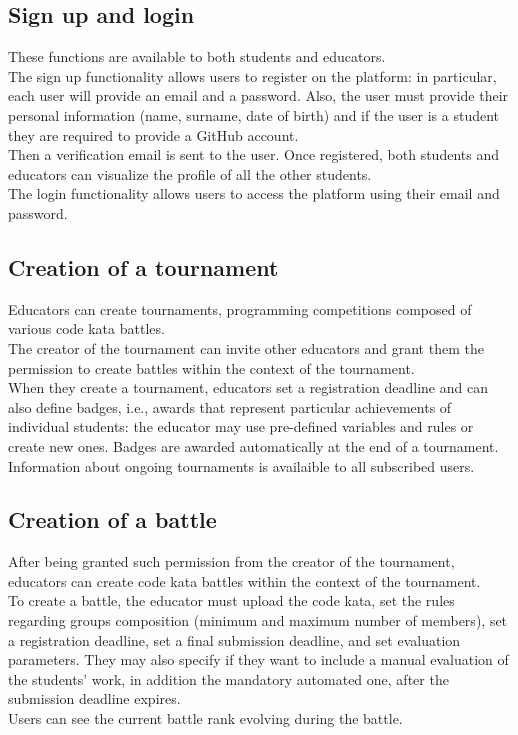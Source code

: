 \subsection{Sign up and login}
These functions are available to both students and educators.\\
The sign up functionality allows users to register on the platform: in particular, each user will provide an email 
and a password. Also, the user must provide their personal information (name, surname, date of birth) and 
if the user is a student they are required to provide a GitHub account.\\
Then a verification email is sent to the user.
Once registered, both students and educators can visualize the profile of all the other students.\\
The login functionality allows users to access the platform using their email and password.\\

\subsection{Creation of a tournament}
Educators can create tournaments, programming competitions composed of various code kata battles.\\
The creator of the tournament can invite other educators and grant them the permission to create battles within the 
context of the tournament.\\
When they create a tournament, educators set a registration deadline and can also define badges, i.e., awards that 
represent particular achievements of individual students: the educator may use pre-defined variables and rules or create 
new ones. Badges are awarded automatically at the end of a tournament.\\
Information about ongoing tournaments is availaible to all subscribed users.\\

\subsection{Creation of a battle}
After being granted such permission from the creator of the tournament, educators can create code kata battles within the
context of the tournament.\\
To create a battle, the educator must upload the code kata, set the rules regarding groups composition (minimum and maximum 
number of members), set a registration deadline, set a final submission deadline, and set evaluation parameters. They may also 
specify if they want to include a manual evaluation of the students' work, in addition the mandatory automated one, after the 
submission deadline expires.\\
Users can see the current battle rank evolving during the battle.\\

